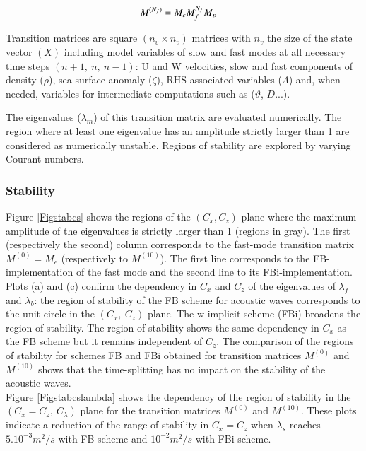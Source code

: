 \documentclass[a4paper,11pt]{article}
\begin{document}
\begin{equation}
   \begin{split}
    \displaystyle
     & M^{(N_f)} = M_c M_f^{N_f} M_p
   \end{split}
\end{equation}

Transition matrices are square $(n_v\times n_v)$ matrices with $n_v$ the size of the state vector $(X)$ including model variables of slow and fast modes at all necessary time steps $(n+1,\ n,\ n-1)$: U and W velocities, slow and fast components of density ($\rho$), sea surface anomaly ($\zeta$), RHS-associated variables ($\Lambda$) and, when needed, variables for intermediate computations such as ($\vartheta$, $D$...).

The eigenvalues ($\lambda_m$) of this transition matrix are evaluated numerically. The region where at least one eigenvalue has an amplitude strictly larger than 1 are considered as numerically unstable. Regions of stability are explored by varying Courant numbers.\\

\subsubsection{Stability}

Figure \ref{Figstabcs} shows the regions of the $(C_x, C_z)$ plane where the maximum amplitude of the eigenvalues is strictly larger than 1 (regions in gray). The first (respectively the second) column corresponds  to the fast-mode transition matrix $M^{(0)}=M_e$ (respectively to $M^{(10)}$). The first line corresponds to the FB-implementation of the fast mode and the second line to its FBi-implementation.\\
Plots (a) and (c) confirm the dependency in $C_{x}$ and $C_{z}$ of the eigenvalues of $\lambda_f$ and  $\lambda_b$: the region of stability of the FB scheme for acoustic waves corresponds to the unit circle in the $(C_x,\ C_z)$ plane. The w-implicit scheme (FBi) broadens the region of stability. The region of stability shows the same dependency in $C_x$ as the FB scheme but it remains independent of $C_z$. The  comparison of the regions of stability for schemes FB and FBi obtained for transition matrices $M^{(0)}$ and $M^{(10)}$ shows that the time-splitting has no impact on the stability of the acoustic waves.\\

Figure \ref{Figstabcslambda} shows the dependency of the region of stability in the  $(C_x=C_z,\ C_{\lambda})$ plane for the transition matrices $M^{(0)}$ and $M^{(10)}$. These plots indicate a reduction of the range of stability in $C_x=C_z$ when $\lambda_s$ reaches $5.10^{-3} m^2/s$ with FB scheme and $10^{-2} m^2/s$ with FBi scheme.\\
\end{document}
